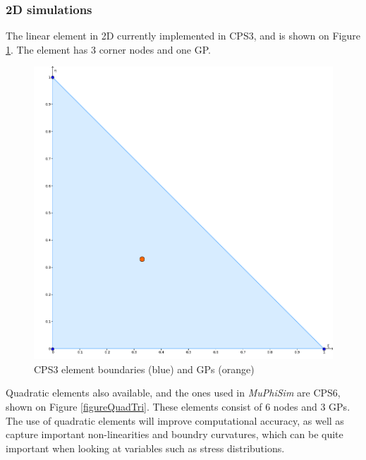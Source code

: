 \documentclass[oneside,11pt,times]{book}
\begin{document}
\subsubsection{2D simulations}
The linear element in 2D currently implemented in CPS3, and is shown on Figure \ref{figureLinTri}. The element has 3 corner nodes and one GP.
\begin{figure}[!htb]
\centering
 \includegraphics[scale=0.3]{imgs/SpatialDiscretisation/TriLin.png}
 \caption{CPS3 element boundaries (blue) and GPs (orange)}
 \label{figureLinTri}
\end{figure}

Quadratic elements also available, and the ones used in \textit{MuPhiSim} are CPS6, shown on Figure \ref{figureQuadTri}. These elements consist of 6 nodes and 3 GPs. The use of quadratic elements will improve computational accuracy, as well as capture important non-linearities and boundry curvatures, which can be quite important when looking at variables such as stress distributions.
\end{document}
